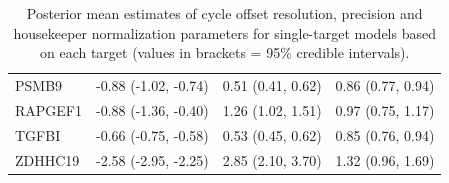 \documentclass[../thesis.tex]{subfiles}
\begin{document}
\begin{table}[!t]
{\begin{tabular}{|l|lll|}
PSMB9 &  -0.88 (-1.02,  -0.74) & 0.51 (0.41,  0.62) & 0.86 (0.77,  0.94) \\ 
RAPGEF1 &  -0.88 (-1.36,  -0.40) & 1.26 (1.02,  1.51) & 0.97 (0.75,  1.17) \\ 
TGFBI &  -0.66 (-0.75,  -0.58) & 0.53 (0.45,  0.62) & 0.85 (0.76,  0.94) \\ 
ZDHHC19 &  -2.58 (-2.95,  -2.25) & 2.85 (2.10,  3.70) & 1.32 (0.96,  1.69) \\ 
\hline
\end{tabular}}
\caption{Posterior mean estimates of cycle offset resolution, precision and housekeeper normalization parameters for single-target models based on each target (values in brackets = 95\% credible intervals).\label{tab:single_target_sens_prec_c}}
\end{table}
\end{document}
